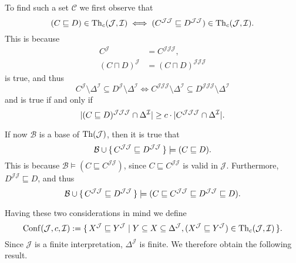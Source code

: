 To find such a set $\mathcal{C}$ we first observe that
\begin{equation*}
  (C \sqsubseteq D) \in \operatorname{Th}_{c}(\mathcal{J}, \mathcal{I}) \iff (C^{\mathcal{J}\mathcal{J}}
  \sqsubseteq D^{\mathcal{J}\mathcal{J}}) \in \operatorname{Th}_{c}(\mathcal{J}, \mathcal{I}).
\end{equation*}
This is because
\begin{align*}
  C^{\mathcal{J}} &= C^{\mathcal{J}\mathcal{J}\mathcal{J}},\\
  (C \sqcap D)^{\mathcal{J}} &= (C \sqcap D)^{\mathcal{J}\mathcal{J}\mathcal{J}}
\end{align*}
is true, and thus
\begin{equation*}
  C^{\mathcal{J}} \setminus \Delta^{\mathcal{I}} \subseteq D^{\mathcal{J}} \setminus
  \Delta^{\mathcal{I}} \iff C^{\mathcal{J}\mathcal{J}\mathcal{J}} \setminus
  \Delta^{\mathcal{I}} \subseteq D^{\mathcal{J}\mathcal{J}\mathcal{J}} \setminus \Delta^{\mathcal{I}}
\end{equation*}
and  is true if and only if
\begin{equation*}
  \lvert (C \sqsubseteq D)^{\mathcal{J}\mathcal{J}\mathcal{J}} \cap \Delta^{\mathcal{I}} \rvert
  \ge c \cdot \lvert C^{\mathcal{J}\mathcal{J}\mathcal{J}} \cap \Delta^{\mathcal{I}} \rvert.
\end{equation*}

If now $\mathcal{B}$ is a base of $\operatorname{Th}(\mathcal{J})$, then it is true that
\begin{equation*}
  \mathcal{B} \cup {\ensuremath{\{\, C^{\mathcal{J}\mathcal{J}} \sqsubseteq D^{\mathcal{J}\mathcal{J}}
  \,\}}} \models (C \sqsubseteq D).
\end{equation*}
This is because $\mathcal{B} \models (C \sqsubseteq C^{\mathcal{J}\mathcal{J}})$, since $C
\sqsubseteq C^{\mathcal{J}\mathcal{J}}$ is valid in $\mathcal{J}$.  Furthermore,
$D^{\mathcal{J}\mathcal{J}} \sqsubseteq D$, and thus
\begin{equation*}
  \mathcal{B} \cup {\ensuremath{\{\, C^{\mathcal{J}\mathcal{J}} \sqsubseteq D^{\mathcal{J}\mathcal{J}}
  \,\}}} \models (C \sqsubseteq C^{\mathcal{J}\mathcal{J}} \sqsubseteq
  D^{\mathcal{J}\mathcal{J}} \sqsubseteq D).
\end{equation*}

Having these two considerations in mind we define
\begin{equation*}
  \operatorname{Conf}(\mathcal{J}, c, \mathcal{I}) := {\{\, X^{\mathcal{J}} \sqsubseteq
    Y^{\mathcal{J}} \mid Y \subseteq X \subseteq \Delta^{\mathcal{J}}, (X^{\mathcal{J}}
\sqsubseteq Y^{\mathcal{J}}) \in \operatorname{Th}_{c}(\mathcal{J}, \mathcal{I}) \,\}}.
\end{equation*}
Since $\mathcal{J}$ is a finite interpretation, $\Delta^{\mathcal{J}}$ is finite.  We
therefore obtain the following result.

